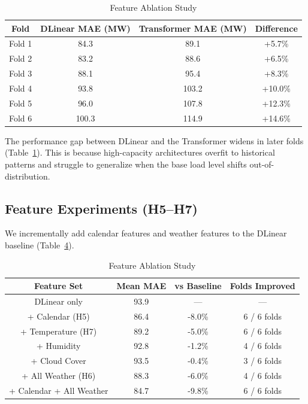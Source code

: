 \documentclass[journal]{IEEEtran}
\begin{document}
\begin{table}[t]
\begin{table}[htbp]
\caption{Per-Fold Breakdown (DLinear vs. Transformer)}
\label{tab:fold_breakdown_fail}
\centering
\begin{tabular}{cccc}
\toprule
\textbf{Fold} & \textbf{DLinear MAE (MW)} & \textbf{Transformer MAE (MW)} & \textbf{Difference} \\
\midrule
Fold 1 & 84.3 & 89.1 & +5.7\% \\
Fold 2 & 83.2 & 88.6 & +6.5\% \\
Fold 3 & 88.1 & 95.4 & +8.3\% \\
Fold 4 & 93.8 & 103.2 & +10.0\% \\
Fold 5 & 96.0 & 107.8 & +12.3\% \\
Fold 6 & 100.3 & 114.9 & +14.6\% \\
\bottomrule
\end{tabular}
\end{table}

The performance gap between DLinear and the Transformer widens in later folds (Table~\ref{tab:fold_breakdown_fail}). This is because high-capacity architectures overfit to historical patterns and struggle to generalize when the base load level shifts out-of-distribution.

\subsection{Feature Experiments (H5--H7)}
We incrementally add calendar features and weather features to the DLinear baseline (Table~\ref{tab:feature_failures}).

\begin{table}[htbp]
\caption{Feature Ablation Study}
\label{tab:feature_failures}
\centering
\begin{tabular}{cccc}
\toprule
\textbf{Feature Set} & \textbf{Mean MAE} & \textbf{vs Baseline} & \textbf{Folds Improved} \\
\midrule
DLinear only & 93.9 & --- & --- \\
+ Calendar (H5) & 86.4 & -8.0\% & 6 / 6 folds \\
+ Temperature (H7) & 89.2 & -5.0\% & 6 / 6 folds \\
+ Humidity & 92.8 & -1.2\% & 4 / 6 folds \\
+ Cloud Cover & 93.5 & -0.4\% & 3 / 6 folds \\
+ All Weather (H6) & 88.3 & -6.0\% & 4 / 6 folds \\
+ Calendar + All Weather & 84.7 & -9.8\% & 6 / 6 folds \\
\bottomrule
\end{tabular}
\end{table}


\end{table}
\end{document}
